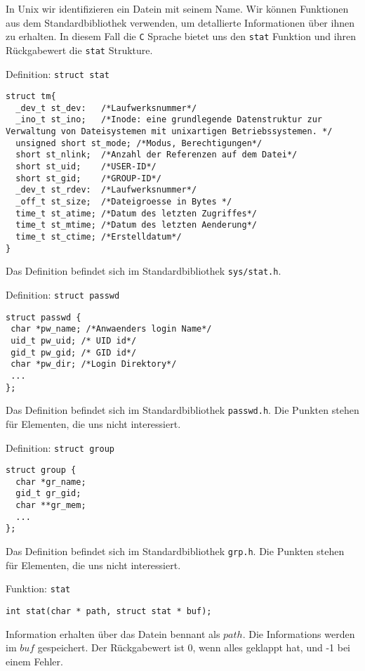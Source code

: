 In Unix wir identifizieren ein Datein mit seinem Name. Wir können Funktionen aus dem Standardbibliothek verwenden, um
detallierte Informationen über ihnen zu erhalten. In diesem Fall die \texttt{C} Sprache bietet uns den \texttt{stat} Funktion 
und ihren Rückgabewert die \texttt{stat} Strukture. 
\begin{myexampleblock}{Definition: \texttt{struct stat}}
\begin{lstlisting}
struct tm{
  _dev_t st_dev:   /*Laufwerksnummer*/
  _ino_t st_ino;   /*Inode: eine grundlegende Datenstruktur zur Verwaltung von Dateisystemen mit unixartigen Betriebssystemen. */
  unsigned short st_mode; /*Modus, Berechtigungen*/
  short st_nlink;  /*Anzahl der Referenzen auf dem Datei*/
  short st_uid;    /*USER-ID*/
  short st_gid;    /*GROUP-ID*/
  _dev_t st_rdev:  /*Laufwerksnummer*/
  _off_t st_size;  /*Dateigroesse in Bytes */
  time_t st_atime; /*Datum des letzten Zugriffes*/
  time_t st_mtime; /*Datum des letzten Aenderung*/
  time_t st_ctime; /*Erstelldatum*/
}
\end{lstlisting}
\vspace{-0.4cm}
Das Definition befindet sich im Standardbibliothek \texttt{sys/stat.h}.
\end{myexampleblock}
\begin{myexampleblock}{Definition: \texttt{struct passwd}}
\begin{lstlisting}
struct passwd {
 char *pw_name; /*Anwaenders login Name*/
 uid_t pw_uid; /* UID id*/
 gid_t pw_gid; /* GID id*/
 char *pw_dir; /*Login Direktory*/
 ...
}; 
\end{lstlisting}
\vspace{-0.4cm}
Das Definition befindet sich im Standardbibliothek \texttt{passwd.h}.
Die Punkten stehen für Elementen, die uns nicht interessiert.
\end{myexampleblock}
\begin{myexampleblock}{Definition: \texttt{struct group}}
\begin{lstlisting}
struct group {
  char *gr_name;
  gid_t gr_gid;
  char **gr_mem;
  ...
};
\end{lstlisting}
\vspace{-0.4cm}
Das Definition befindet sich im Standardbibliothek \texttt{grp.h}.
Die Punkten stehen für Elementen, die uns nicht interessiert.
\end{myexampleblock}
\begin{myexampleblock}{Funktion: \texttt{stat}}
\begin{lstlisting}
int stat(char * path, struct stat * buf);
\end{lstlisting}
\vspace{-.4cm}
Information erhalten über das Datein bennant als $path$. Die Informations werden im $buf$ gespeichert.
Der Rückgabewert ist 0, wenn alles geklappt hat, und -1 bei einem Fehler.
\end{myexampleblock}
